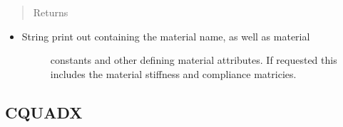 \documentclass[letterpaper,10pt,english]{sphinxmanual}
\begin{document}
\begin{fulllineitems}
\begin{fulllineitems}
\begin{itemize}
\begin{description}
\end{description}

\end{itemize}
\begin{quote}\begin{description}
\item[{Returns}] \leavevmode
\end{description}\end{quote}
\begin{itemize}
\item {} \begin{description}
\item[{String print out containing the material name, as well as material}] \leavevmode
constants and other defining material attributes. If requested
this includes the material stiffness and compliance matricies.

\end{description}

\end{itemize}

\end{fulllineitems}


\end{fulllineitems}



\subsection{CQUADX}
\label{structures:cquadx}
\end{document}
